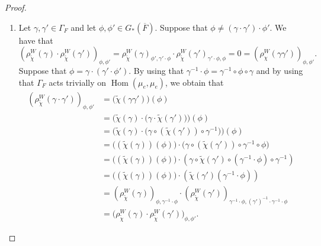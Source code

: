 \documentclass[a4paper,english,12pt]{amsart}
\newcommand{\CC}{\mathbb{C}}
\newcommand{\wchi}{\widetilde{\chi}}
\DeclareMathOperator{\Hom}{Hom}
\DeclareMathOperator{\cont}{cont}
\DeclareMathOperator{\tr}{tr}
\numberwithin{equation}{subsection}
\begin{document}
\begin{proof}
\begin{enumerate}
\item Let $\gamma, \gamma'\in\Gamma_F$ and let $\phi, \phi'\in G_*(\overline F).$ Suppose that $\phi\neq (\gamma\cdot\gamma')\cdot\phi'$. We have that $$(\rho^W_{\widetilde\chi}(\gamma)\cdot\rho^W_{\widetilde\chi}(\gamma'))_{\phi, \phi'}=\rho^W_{\widetilde\chi}(\gamma)_{\phi',\gamma'\cdot\phi}\cdot \rho^W_{\widetilde\chi}(\gamma')_{\gamma'\cdot\phi,\phi}=0=(\rho^W_\chi(\gamma\gamma'))_{\phi, \phi'}.$$
Suppose that $\phi=\gamma\cdot(\gamma'\cdot\phi')$. By using that $\gamma^{-1}\cdot\phi=\gamma^{-1}\circ\phi\circ\gamma$ and by using that $\Gamma_F$ acts trivially on $\Hom(\mu_e,\mu_e)$, we obtain that
\begin{align*}
(\rho^W_{\wchi}(\gamma\cdot\gamma'))_{\phi, \phi'}&=\big(\widetilde \chi(\gamma\gamma')\big)(\phi)\\
&=\big(\widetilde\chi(\gamma)\cdot\big(\gamma\cdot \widetilde\chi(\gamma')\big)\big)(\phi)\\
&=\big(\widetilde\chi(\gamma)\cdot\big(\gamma\circ(\widetilde\chi(\gamma'))\circ\gamma^{-1}\big)\big)(\phi)\\
&=\big((\widetilde\chi(\gamma))(\phi)\big)\cdot \big(\gamma\circ(\widetilde\chi(\gamma'))\circ\gamma^{-1}\circ\phi\big)\\
&=\big((\widetilde\chi(\gamma))(\phi)\big)\cdot (\gamma\circ\widetilde\chi(\gamma')\circ(\gamma^{-1}\cdot\phi)\circ\gamma^{-1})\\
&=\big((\widetilde\chi(\gamma))(\phi)\big)\cdot (\widetilde\chi(\gamma') (\gamma^{-1}\cdot\phi))\\
&=(\rho^W_{\widetilde\chi}(\gamma))_{\phi,\gamma^{-1}\cdot\phi}\cdot(\rho^W_{\widetilde\chi}(\gamma'))_{\gamma^{-1}\cdot\phi, (\gamma')^{-1}\cdot\gamma^{-1}\cdot \phi}\\
&=\big(\rho^W_{\wchi}(\gamma)\cdot\rho^W_{\wchi}(\gamma')\big)_{\phi, \phi'}.
\end{align*}

\end{enumerate}
\end{proof}
\end{document}
